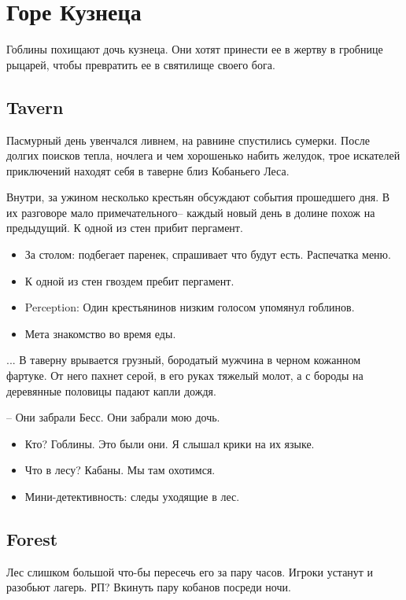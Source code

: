 \documentclass[a4paper,11pt]{book}
\begin{document}
\chapter{Горе Кузнеца}
\begin{multicols}{2}
Гоблины похищают дочь кузнеца. Они хотят принести ее в жертву в гробнице рыцарей, чтобы превратить ее в святилище своего бога.
\section{Tavern}

\begin{framed}
Пасмурный день увенчался ливнем, на равнине спустились сумерки. После долгих поисков тепла, ночлега и чем хорошенько набить желудок, трое искателей приключений находят себя в таверне близ Кобаньего Леса.

Внутри, за ужином несколько крестьян обсуждают события прошедшего дня. В их разговоре мало примечательного-- каждый новый день в долине похож на предыдущий. К одной из стен прибит пергамент.
\end{framed}

\begin{itemize}
  \item За столом: подбегает паренек, спрашивает что будут есть. Распечатка меню.
  \item К одной из стен гвоздем пребит пергамент.
  \item Perception: Один крестьянинов низким голосом упомянул гоблинов.
  \item Мета знакомство во время еды.
\end{itemize}

\begin{framed}
... В таверну врывается грузный, бородатый мужчина в черном кожанном фартуке. От него пахнет серой, в его руках тяжелый молот, а с бороды на деревянные половицы падают капли дождя.

-- Они забрали Бесс. Они забрали мою дочь.
\end{framed}

\begin{itemize}
  \item Кто? Гоблины. Это были они. Я слышал крики на их языке.
  \item Что в лесу? Кабаны. Мы там охотимся.
  \item Мини-детективность: следы уходящие в лес.
\end{itemize}

\section{Forest}
Лес слишком большой что-бы пересечь его за пару часов. Игроки устанут и разобьют лагерь. РП? Вкинуть пару кобанов посреди ночи.


\end{multicols}
\end{document}
